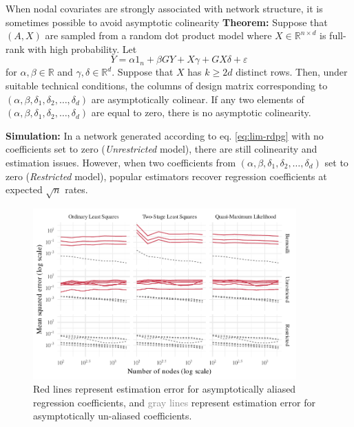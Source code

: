 \documentclass[final]{beamer}
\newcommand{\R}{\mathbb{R}}
\newlength{\colwidth}
\begin{document}
\begin{frame}[t]
\begin{columns}[t]
\begin{column}{\colwidth}
\begin{block}{When nodal covariates are strongly associated with network structure, it is sometimes possible to avoid asymptotic colinearity}
                \textbf{Theorem:} Suppose that $(A, X)$ are sampled from a random dot product model where $X \in \mathbb{R}^{n \times d}$ is full-rank with high probability. Let
                \begin{equation} \label{eq:lim-rdpg}
                    Y = \alpha 1_n + \beta G Y + X \gamma + G X \delta + \varepsilon
                \end{equation}
                for $\alpha, \beta \in \R$ and $\gamma, \delta \in \R^d$. Suppose that $X$ has $k \ge 2d$ distinct rows. Then, under suitable technical conditions, the columns of design matrix corresponding to $(\alpha, \beta, \delta_1, \delta_2, \dots, \delta_d)$ are asymptotically colinear. If any two elements of $(\alpha, \beta, \delta_1, \delta_2, \dots, \delta_d)$ are equal to zero, there is no asymptotic colinearity.

                \textbf{Simulation:} In a network generated according to eq. \eqref{eq:lim-rdpg} with no coefficients set to zero (\emph{Unrestricted} model), there are still colinearity and estimation issues. However, when two coefficients from $(\alpha, \beta, \delta_1, \delta_2, \dots, \delta_d)$ set to zero (\emph{Restricted} model), popular estimators recover regression coefficients at expected $\sqrt{n}$ rates.

                \begin{figure}
                    \centering
                    \includegraphics[width=0.9\textwidth]{./figures/simulations/biometrika-mse-all.pdf}
                    \caption{\textcolor{Mahogany}{Red lines} represent estimation error for asymptotically aliased regression coefficients, and \textcolor{gray}{gray lines} represent estimation error for asymptotically un-aliased coefficients.}
                \end{figure}


\end{block}
\end{column}
\end{columns}
\end{frame}
\end{document}
